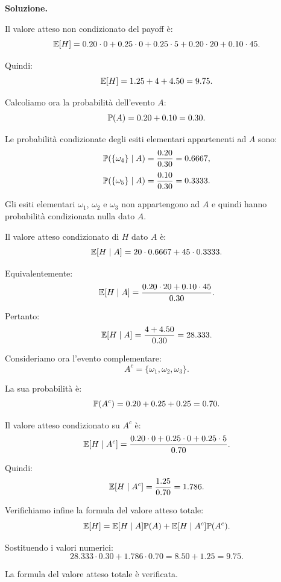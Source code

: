 \noindent
\textbf{Soluzione.}

Il valore atteso non condizionato del payoff \`{e}:
\[
\mathbb{E}[H]
=
0.20\cdot0
+
0.25\cdot0
+
0.25\cdot5
+
0.20\cdot20
+
0.10\cdot45.
\]

Quindi:
\[
\mathbb{E}[H]
=
1.25+4+4.50
=
9.75.
\]

Calcoliamo ora la probabilit\`{a} dell'evento $A$:
\[
\mathbb{P}(A)
=
0.20+0.10
=
0.30.
\]

Le probabilit\`{a} condizionate degli esiti elementari appartenenti ad $A$
sono:
\[
\mathbb{P}(\{\omega_4\}\mid A)
=
\frac{0.20}{0.30}
=
0.6667,
\]
\[
\mathbb{P}(\{\omega_5\}\mid A)
=
\frac{0.10}{0.30}
=
0.3333.
\]

Gli esiti elementari $\omega_1$, $\omega_2$ e $\omega_3$ non appartengono ad
$A$ e quindi hanno probabilit\`{a} condizionata nulla dato $A$.

Il valore atteso condizionato di $H$ dato $A$ \`{e}:
\[
\mathbb{E}[H\mid A]
=
20\cdot0.6667
+
45\cdot0.3333.
\]

Equivalentemente:
\[
\mathbb{E}[H\mid A]
=
\frac{
0.20\cdot20
+
0.10\cdot45
}
{0.30}.
\]

Pertanto:
\[
\mathbb{E}[H\mid A]
=
\frac{4+4.50}{0.30}
=
28.333.
\]

Consideriamo ora l'evento complementare:
\[
A^c
=
\{\omega_1,\omega_2,\omega_3\}.
\]

La sua probabilit\`{a} \`{e}:
\[
\mathbb{P}(A^c)
=
0.20+0.25+0.25
=
0.70.
\]

Il valore atteso condizionato su $A^c$ \`{e}:
\[
\mathbb{E}[H\mid A^c]
=
\frac{
0.20\cdot0
+
0.25\cdot0
+
0.25\cdot5
}
{0.70}.
\]

Quindi:
\[
\mathbb{E}[H\mid A^c]
=
\frac{1.25}{0.70}
=
1.786.
\]

Verifichiamo infine la formula del valore atteso totale:
\[
\mathbb{E}[H]
=
\mathbb{E}[H\mid A]\mathbb{P}(A)
+
\mathbb{E}[H\mid A^c]\mathbb{P}(A^c).
\]

Sostituendo i valori numerici:
\[
28.333\cdot0.30
+
1.786\cdot0.70
=
8.50+1.25
=
9.75.
\]

La formula del valore atteso totale \`{e} verificata.

\medskip

